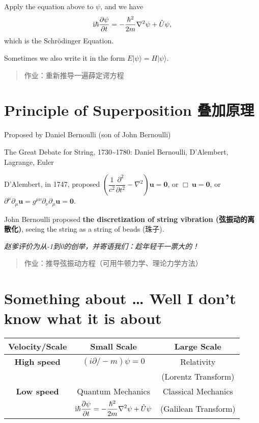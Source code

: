 Apply the equation above to \(\psi\), and we have \[\mathrm i \hbar {\partial \psi \over \partial t} = -{\hbar^2 \over 2m} \nabla^2 \psi + \hat U \psi, \] which is the Schrödinger Equation.

Sometimes we also write it in the form \(E | \psi \rangle =H| \psi \rangle\).

\begin{quote}
作业：重新推导一遍薛定谔方程
\end{quote}

\section{Principle of Superposition 叠加原理}\label{principle-of-superposition-ux53e0ux52a0ux539fux7406}

Proposed by Daniel Bernoulli (son of John Bernoulli)

The Great Debate for String, 1730\textasciitilde1780: Daniel Bernoulli, D'Alembert, Lagrange, Euler

D'Alembert, in 1747, proposed \(\left(\dfrac{1}{c^2} \dfrac{\partial^2}{\partial t^2}- \nabla^2 \right) \boldsymbol u= \boldsymbol 0\), or \(\Box \ \boldsymbol u = \boldsymbol 0\), or \(\partial ^\mu \partial _\mu \boldsymbol u = g^{\mu\nu}\partial_\nu \partial _\mu \boldsymbol u = \boldsymbol 0\).

John Bernoulli proposed \textbf{the discretization of string vibration (弦振动的离散化)}, seeing the string as a string of beads (珠子).

\emph{赵爹评价为从-1到0的创举，并寄语我们：趁年轻干一票大的！}

\begin{quote}
作业：推导弦振动方程（可用牛顿力学、理论力学方法）
\end{quote}

\section{Something about \ldots{} Well I don't know what it is about}\label{something-about-well-i-dont-know-what-it-is-about}

\begin{center}
    \begin{tabular}{| c | c | c |}
        \hline
        \textbf{Velocity/Scale} & \textbf{Small Scale} & \textbf{Large Scale} \\
        \hline
        \textbf{High speed} & $(i \partial \!\!\!/ - m) \psi = 0$ & Relativity\\
        & & (Lorentz Transform) \\
        \hline
        \textbf{Low speed} & Quantum Mechanics & Classical Mechanics\\
        & $\displaystyle \mathrm i \hbar {\partial \psi \over \partial t} = -{\hbar^2 \over 2m} \nabla^2 \psi + \hat U \psi$ & (Galilean Transform) \\[1em]
        \hline
    \end{tabular}
\end{center}


